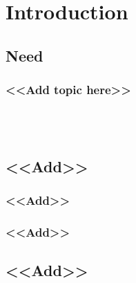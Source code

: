 


\chapter{Introduction}

\section{Need}

\subsection{<<Add topic here>>}




\\ \\


\section{<<Add>>}

\subsection{<<Add>>}

\subsection{<<Add>>}
\section{<<Add>>}
